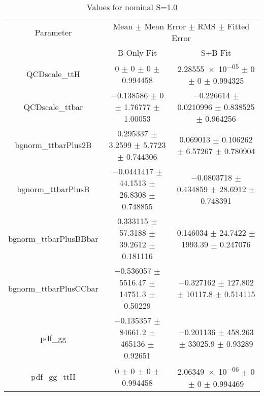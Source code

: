 \begin{table}
\centering
\caption{Values for nominal S=1.0}
\begin{tabular}{ccc}
\toprule
Parameter & \multicolumn{2}{c}{Mean $\pm$ Mean Error $\pm$ RMS $\pm$ Fitted Error}\\
 & B-Only Fit & S+B Fit\\
\midrule
QCDscale\_ttH & \num{0} $\pm$ \num{0} $\pm$ \num{0} $\pm$ \num{0.994458} & \num{2.28555e-05} $\pm$ \num{0} $\pm$ \num{0} $\pm$ \num{0.994325}\\
QCDscale\_ttbar & \num{-0.138586} $\pm$ \num{0} $\pm$ \num{1.76777} $\pm$ \num{1.00053} & \num{-0.226614} $\pm$ \num{0.0210996} $\pm$ \num{0.838525} $\pm$ \num{0.964256}\\
bgnorm\_ttbarPlus2B & \num{0.295337} $\pm$ \num{3.2599} $\pm$ \num{5.7723} $\pm$ \num{0.744306} & \num{0.069013} $\pm$ \num{0.106262} $\pm$ \num{6.57267} $\pm$ \num{0.780904}\\
bgnorm\_ttbarPlusB & \num{-0.0441417} $\pm$ \num{44.1513} $\pm$ \num{26.8308} $\pm$ \num{0.748855} & \num{-0.0803718} $\pm$ \num{0.434859} $\pm$ \num{28.6912} $\pm$ \num{0.748391}\\
bgnorm\_ttbarPlusBBbar & \num{0.333115} $\pm$ \num{57.3188} $\pm$ \num{39.2612} $\pm$ \num{0.181116} & \num{0.146034} $\pm$ \num{24.7422} $\pm$ \num{1993.39} $\pm$ \num{0.247076}\\
bgnorm\_ttbarPlusCCbar & \num{-0.536057} $\pm$ \num{5516.47} $\pm$ \num{14751.3} $\pm$ \num{0.50229} & \num{-0.327162} $\pm$ \num{127.802} $\pm$ \num{10117.8} $\pm$ \num{0.514115}\\
pdf\_gg & \num{-0.135357} $\pm$ \num{84661.2} $\pm$ \num{465136} $\pm$ \num{0.92651} & \num{-0.201136} $\pm$ \num{458.263} $\pm$ \num{33025.9} $\pm$ \num{0.93289}\\
pdf\_gg\_ttH & \num{0} $\pm$ \num{0} $\pm$ \num{0} $\pm$ \num{0.994458} & \num{2.06349e-06} $\pm$ \num{0} $\pm$ \num{0} $\pm$ \num{0.994469}\\
\bottomrule
\end{tabular}
\end{table}